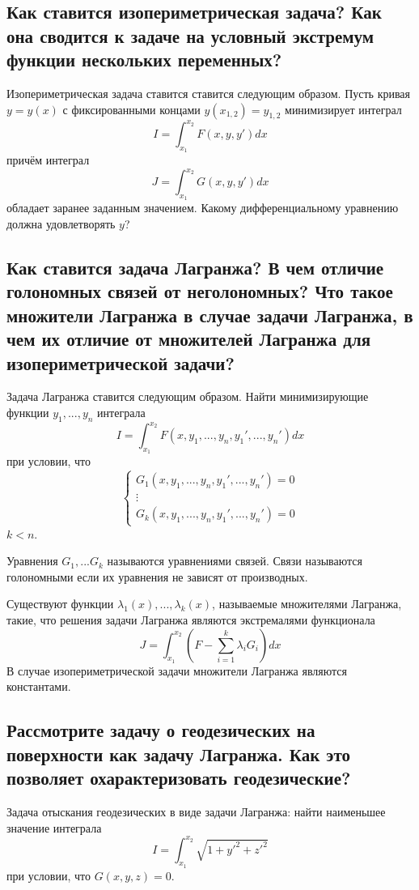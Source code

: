 \documentclass{article}
\newcommand{\Lg}{Лагранжа}
\begin{document}
\subsection{Как ставится изопериметрическая задача? Как она сводится к задаче на условный экстремум функции нескольких переменных?}
Изопериметрическая задача ставится ставится следующим образом. Пусть кривая $ y=y(x) $ с фиксированными концами $ y(x_{1,2})=y_{1,2} $
минимизирует интеграл
\[ I=\int_{x_1}^{x_2} F(x, y, y')dx \]
причём интеграл 
\[ J=\int_{x_1}^{x_2} G(x, y, y')dx \]
обладает заранее заданным значением. Какому дифференциальному уравнению должна удовлетворять $y$?
 
\subsection{Как ставится задача Лагранжа? В чем отличие голономных связей от неголономных? Что такое множители Лагранжа в случае задачи Лагранжа, в чем их отличие от множителей Лагранжа для изопериметрической задачи?}
Задача Лагранжа ставится следующим образом. Найти минимизирующие функции $y_1, ..., y_n$ интеграла
\[ I=\int_{x_1}^{x_2} F(x, y_1, ..., y_n, y_1', ..., y_n')dx \]
при условии, что 
\[ \left \{
\begin{matrix}
	G_1(x, y_1, ..., y_n, y_1', ..., y_n')=0\\ 
	\vdots \\ 
	G_k(x, y_1, ..., y_n, y_1', ..., y_n')=0
\end{matrix}
\right. \]
$k<n$.

Уравнения $G_1,...G_k$ называются уравнениями связей. Связи называются голономными если их уравнения не зависят от производных.

Существуют функции $\lambda_1(x), ..., \lambda_k(x)$, называемые множителями \Lg, такие, что решения задачи \Lg{} являются экстремалями функционала 
\[ J=\int_{x_1}^{x_2}(F-\sum_{i=1}^{k}\lambda_i G_i)dx \] 
В случае изопериметрической задачи множители \Lg{} являются константами.
\subsection{Рассмотрите задачу о геодезических на поверхности как задачу Лагранжа. Как это позволяет охарактеризовать геодезические?}

Задача отыскания геодезических в виде задачи \Lg: найти наименьшее значение интеграла
\[ I=\int_{x_1}^{x_2} \sqrt{1+y'^2+z'^2} \]
при условии, что $ G(x, y, z)=0 $.
\end{document}
